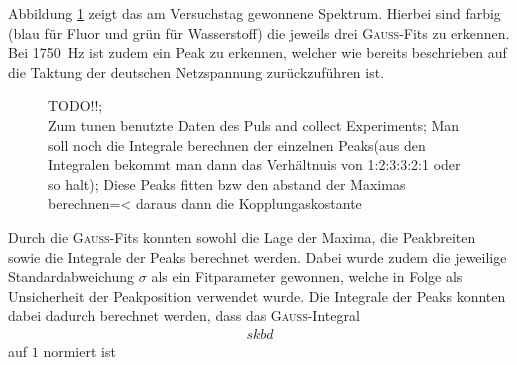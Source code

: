 Abbildung \ref{fig:JKopplungExp} zeigt das am Versuchstag gewonnene Spektrum.
Hierbei sind farbig (blau für Fluor und grün für Wasserstoff) die jeweils drei \textsc{Gauss}-Fits zu erkennen. 
Bei \SI{1750}{\hertz} ist zudem ein Peak zu erkennen, welcher wie bereits beschrieben auf die Taktung der deutschen Netzspannung zurückzuführen ist.

\begin{figure}[H]
    \centering
    
    \caption{TODO!!;\\
    Zum tunen benutzte Daten des Puls and collect Experiments; Man soll noch die Integrale berechnen der einzelnen Peaks(aus den Integralen bekommt man dann das Verhältnuis von 1:2:3:3:2:1 oder so halt); Diese Peaks fitten bzw den abstand der Maximas berechnen=< daraus dann die Kopplungaskostante}
    \label{fig:JKopplungExp}
\end{figure}

Durch die \textsc{Gauss}-Fits konnten sowohl die Lage der Maxima, die Peakbreiten sowie die Integrale der Peaks berechnet werden.
Dabei wurde zudem die jeweilige Standardabweichung $\sigma$ als ein Fitparameter gewonnen, welche in Folge als Unsicherheit der Peakposition verwendet wurde.
Die Integrale der Peaks konnten dabei dadurch berechnet werden, dass das \textsc{Gauss}-Integral 
\begin{align}
    skbd
\end{align}
auf $1$ normiert ist
